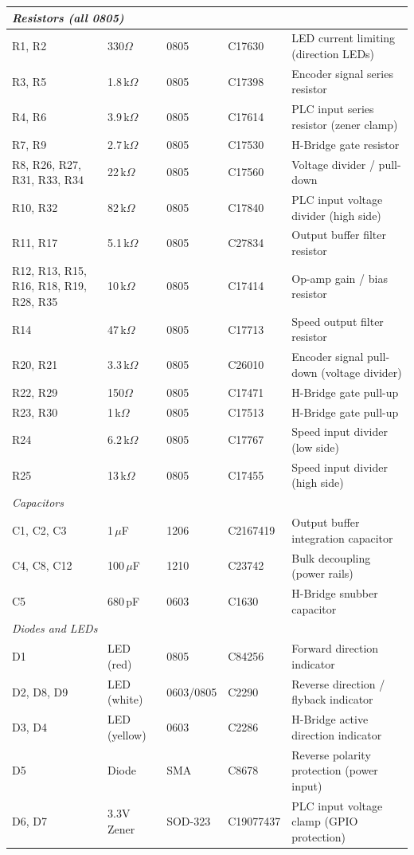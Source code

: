 \documentclass[main.tex]{subfiles}
\begin{document}
\begin{longtable}{l l l l p{4.2cm}}
\multicolumn{5}{l}{\textit{Resistors (all 0805)}} \\
\hline
R1, R2 & 330$\Omega$ & 0805 & C17630 & LED current limiting (direction LEDs) \\
R3, R5 & 1.8\,k$\Omega$ & 0805 & C17398 & Encoder signal series resistor \\
R4, R6 & 3.9\,k$\Omega$ & 0805 & C17614 & PLC input series resistor (zener clamp) \\
R7, R9 & 2.7\,k$\Omega$ & 0805 & C17530 & H-Bridge gate resistor \\
R8, R26, R27, R31, R33, R34 & 22\,k$\Omega$ & 0805 & C17560 & Voltage divider / pull-down \\
R10, R32 & 82\,k$\Omega$ & 0805 & C17840 & PLC input voltage divider (high side) \\
R11, R17 & 5.1\,k$\Omega$ & 0805 & C27834 & Output buffer filter resistor \\
R12, R13, R15, R16, R18, R19, R28, R35 & 10\,k$\Omega$ & 0805 & C17414 & Op-amp gain / bias resistor \\
R14 & 47\,k$\Omega$ & 0805 & C17713 & Speed output filter resistor \\
R20, R21 & 3.3\,k$\Omega$ & 0805 & C26010 & Encoder signal pull-down (voltage divider) \\
R22, R29 & 150$\Omega$ & 0805 & C17471 & H-Bridge gate pull-up \\
R23, R30 & 1\,k$\Omega$ & 0805 & C17513 & H-Bridge gate pull-up \\
R24 & 6.2\,k$\Omega$ & 0805 & C17767 & Speed input divider (low side) \\
R25 & 13\,k$\Omega$ & 0805 & C17455 & Speed input divider (high side) \\
\hline

\multicolumn{5}{l}{\textit{Capacitors}} \\
\hline
C1, C2, C3 & 1\,$\mu$F & 1206 & C2167419 & Output buffer integration capacitor \\
C4, C8, C12 & 100\,$\mu$F & 1210 & C23742 & Bulk decoupling (power rails) \\
C5 & 680\,pF & 0603 & C1630 & H-Bridge snubber capacitor \\
\hline

\multicolumn{5}{l}{\textit{Diodes and LEDs}} \\
\hline
D1 & LED (red) & 0805 & C84256 & Forward direction indicator \\
D2, D8, D9 & LED (white) & 0603/0805 & C2290 & Reverse direction / flyback indicator \\
D3, D4 & LED (yellow) & 0603 & C2286 & H-Bridge active direction indicator \\
D5 & Diode & SMA & C8678 & Reverse polarity protection (power input) \\
D6, D7 & 3.3V Zener & SOD-323 & C19077437 & PLC input voltage clamp (GPIO protection) \\
\hline


\end{longtable}
\end{document}
